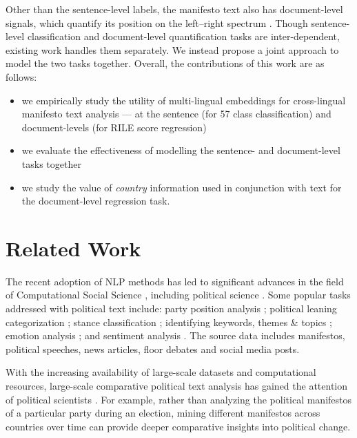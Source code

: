 \documentclass[11pt,a4paper]{article}
\begin{document}

Other than the sentence-level labels, the manifesto text also has document-level signals,
which quantify its position on the left--right spectrum \cite{slapin2008scaling}. Though sentence-level classification and document-level quantification tasks are inter-dependent, existing work handles them separately.  We instead propose a joint approach to model the two tasks together. Overall, the contributions of this work are as follows:
\begin{itemize}
\item we empirically study the utility of multi-lingual embeddings for cross-lingual manifesto text analysis --- at the sentence (for 57 class classification) and document-levels (for RILE score regression)

\item we evaluate the effectiveness of modelling the sentence- and document-level tasks together

\item we study the value of \textit{country} information used in conjunction with text for the document-level regression task.
\end{itemize}


\section{Related Work}

The recent adoption of NLP methods has led to significant advances in the field of Computational Social Science \cite{lazer2009life}, including political science \cite{grimmer2013text}. Some popular tasks addressed with political text include: party position analysis \cite{biessmann2016automating};  political leaning categorization \cite{akoglu2014quantifying, zhou2011classifying}; stance classification \cite{sridhar2014collective}; identifying keywords, themes \& topics \cite{karan2016analysis, nallapati2004extraction, ding2011keyphrase}; emotion analysis \cite{rheault2016expressions}; and sentiment analysis \cite{bakliwal2013sentiment}. The source data includes manifestos, political speeches, news articles, floor debates and social media posts. 

With the increasing availability of large-scale datasets and computational resources, large-scale comparative political text analysis has gained the attention of political scientists \cite{lucas2015computer}. For example, rather than analyzing the political manifestos of a particular party during an election, mining different manifestos across countries over time can provide deeper comparative insights into political change. 
\end{document}
